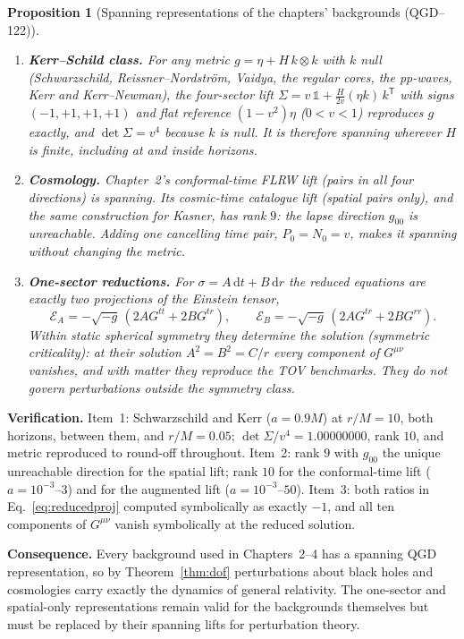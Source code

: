 \documentclass[11pt,a4paper]{article}
\newtheorem{proposition}[theorem]{Proposition}
\begin{document}
\begin{proposition}[Spanning representations of the chapters' backgrounds (QGD--122)]\label{prop:backgrounds}
\begin{enumerate}
\item \textbf{Kerr--Schild class.} For any metric $g=\eta+H\,k\otimes k$ with $k$ null
(Schwarzschild, Reissner--Nordstr\"om, Vaidya, the regular cores, the pp-waves, Kerr and
Kerr--Newman), the four-sector lift
$\Sigma=v\,\mathbb 1+\frac H{2v}(\eta k)\,k^{\mathsf T}$ with signs $(-1,+1,+1,+1)$ and flat reference
$(1-v^2)\eta$ ($0<v<1$) reproduces $g$ exactly, and $\det\Sigma=v^4$ because $k$ is null. It is
therefore spanning wherever $H$ is finite, including at and inside horizons.
\item \textbf{Cosmology.} Chapter~2's conformal-time FLRW lift (pairs in all four directions)
is spanning. Its cosmic-time catalogue lift (spatial pairs only), and the same construction
for Kasner, has rank $9$: the lapse direction $g_{00}$ is unreachable. Adding one cancelling
time pair, $P_0=N_0=v$, makes it spanning without changing the metric.
\item \textbf{One-sector reductions.} For $\sigma=A\,\mathrm dt+B\,\mathrm dr$ the reduced equations
are exactly two projections of the Einstein tensor,
\begin{equation}\label{eq:reducedproj}
\mathcal E_A=-\sqrt{-g}\,(2AG^{tt}+2BG^{tr}),\qquad
\mathcal E_B=-\sqrt{-g}\,(2AG^{tr}+2BG^{rr}).
\end{equation}
Within static spherical symmetry they determine the solution (symmetric criticality): at their
solution $A^2=B^2=C/r$ every component of $G^{\mu\nu}$ vanishes, and with matter they reproduce
the TOV benchmarks. They do not govern perturbations outside the symmetry class.
\end{enumerate}
\end{proposition}
\noindent\textbf{Verification.} Item~1: Schwarzschild and Kerr ($a=0.9M$) at $r/M=10$, both horizons,
between them, and $r/M=0.05$; $\det\Sigma/v^4=1.00000000$, rank $10$, and metric reproduced to
round-off throughout. Item~2: rank $9$ with $g_{00}$ the unique unreachable direction for the
spatial lift; rank $10$ for the conformal-time lift ($a=10^{-3}$--$3$) and for the augmented lift
($a=10^{-3}$--$50$). Item~3: both ratios in Eq.~\eqref{eq:reducedproj} computed symbolically as exactly
$-1$, and all ten components of $G^{\mu\nu}$ vanish symbolically at the reduced solution.

\noindent\textbf{Consequence.} Every background used in Chapters~2--4 has a spanning QGD
representation, so by Theorem~\ref{thm:dof} perturbations about black holes and cosmologies
carry exactly the dynamics of general relativity. The one-sector and spatial-only
representations remain valid for the backgrounds themselves but must be replaced by their
spanning lifts for perturbation theory.
\end{document}
